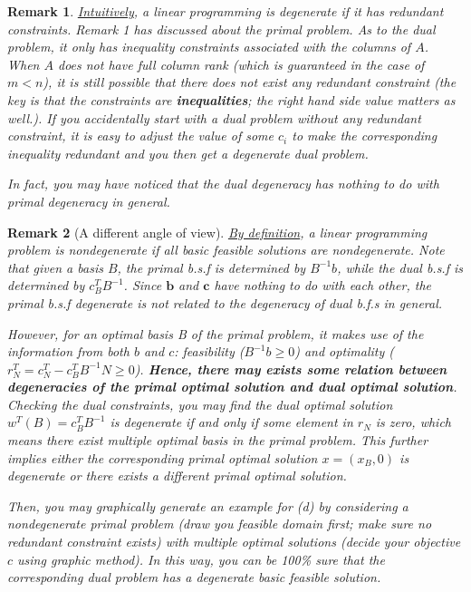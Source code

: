 \documentclass[12pt]{article}
\newtheorem{remark}{Remark}
\begin{document}
\begin{itemize}
\begin{remark}
	\underline{Intuitively}, a linear programming is degenerate if it has redundant constraints. Remark 1 has discussed about the primal problem. As to the dual problem, it only has {inequality} constraints associated with the columns of $A$. When $A$ does not have full column rank (which is guaranteed in the case of $m<n$), it is still possible that there does not exist any redundant constraint (the key is that the constraints are \textbf{inequalities}; the right hand side value matters as well.). If you accidentally start with a dual problem without any redundant constraint, it is easy to adjust the value of some $c_i$ to make the corresponding inequality redundant and you then get a degenerate dual problem. 
	
	In fact, you may have noticed that the dual degeneracy has nothing to do with primal degeneracy in general.
\end{remark}
\begin{remark}[A different angle of view]
	
\underline{By definition}, a linear programming problem is nondegenerate if all basic feasible solutions are nondegenerate. Note that given a basis $B$, the primal b.s.f is determined by $B^{-1}b$, while the dual b.s.f is determined by $c_B^TB^{-1}$. Since $\textbf{b}$ and $\textbf{c}$ have nothing to do with each other, the primal b.s.f degenerate is not related to the degeneracy of dual b.f.s in general. 

However, for an optimal basis B of the primal problem, it makes use of the information from both $b$ and $c$: feasibility ($B^{-1}b\geq 0$) and optimality ($r^T_N=c_N^T-c_B^TB^{-1}N\geq 0$). \textbf{Hence, there may exists some relation between degeneracies of the primal optimal solution and dual optimal solution}. Checking the dual constraints, you may find the dual optimal solution $w^T(B)=c_B^TB^{-1}$ is degenerate if and only if some element in $r_N$ is zero, which means there exist multiple optimal basis in the primal problem. This further implies either the corresponding primal optimal solution $x=(x_B, 0)$ is degenerate or there exists a different primal optimal solution.   

Then, you may graphically generate an example for (d) by considering a nondegenerate primal problem (draw you feasible domain first; make sure no redundant constraint exists) with multiple optimal solutions (decide your objective $c$ using graphic method). In this way, you can be 100\% sure that the corresponding dual problem has a degenerate basic feasible solution. 
\end{remark}


\end{itemize}
\end{document}
